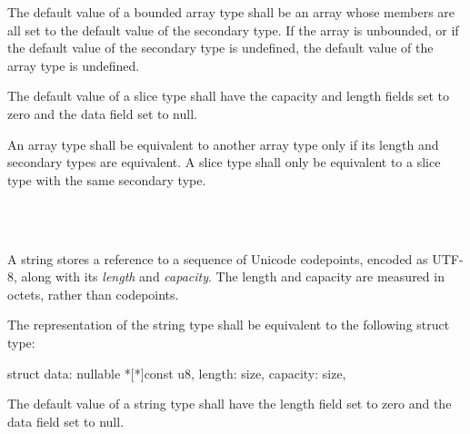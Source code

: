 \specsubsubitem
The default value of a bounded array type shall be an array whose
members are all set to the default value of the secondary type. If the array is
unbounded, or if the default value of the secondary type is undefined, the
default value of the array type is undefined.

\specsubsubitem
The default value of a slice type shall have the capacity and length fields set
to zero and the data field set to null.

\specsubsubitem
An array type shall be equivalent to another array type only if its length and
secondary types are equivalent. A slice type shall only be equivalent to a
slice type with the same secondary type.


\begin{grammar}
 \\
	 \\
\end{grammar}

\specsubsubitem
A string stores a reference to a sequence of Unicode codepoints, encoded as
\hbox{UTF-8}, along with its \textit{length} and \textit{capacity}. The length
and capacity are measured in octets, rather than codepoints.

\specsubsubitem
The representation of the string type shall be equivalent to the following
struct type:

\begin{codesample}
struct {
	data: nullable *[*]const u8,
	length: size,
	capacity: size,
}
\end{codesample}

\specsubsubitem
The default value of a string type shall have the length field set to zero and
the data field set to null.


